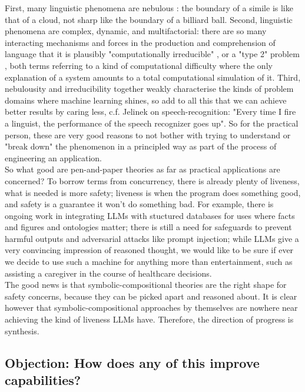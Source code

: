 First, many linguistic phenomena are nebulous \citep{chapmandavidNebulosityMeaningness2010}: the boundary of a simile is like that of a cloud, not sharp like the boundary of a billiard ball. Second, linguistic phenomena are complex, dynamic, and multifactorial: there are so many interacting mechanisms and forces in the production and comprehension of language that it is plausibly "computationally irreducible" \citep{wolframNewKindScience2002}, or a "type 2" problem \citep{marrArtificialIntelligencePersonal1977a}, both terms referring to a kind of computational difficulty where the only explanation of a system amounts to a total computational simulation of it. Third, nebulousity and irreducibility together weakly characterise the kinds of problem domains where machine learning shines, so add to all this that we can achieve better results by caring less, c.f. Jelinek on speech-recognition: "Every time I fire a linguist, the performance of the speech recognizer goes up". So for the practical person, these are very good reasons to not bother with trying to understand or "break down" the phenomenon in a principled way as part of the process of engineering an application.\\

So what good are pen-and-paper theories as far as practical applications are concerned? To borrow terms from concurrency, there is already plenty of liveness, what is needed is more safety; liveness is when the program does something good, and safety is a guarantee it won't do something bad. For example, there is ongoing work in integrating LLMs with stuctured databases for uses where facts and figures and ontologies matter; there is still a need for safeguards to prevent harmful outputs and adversarial attacks like prompt injection; while LLMs give a very convincing impression of reasoned thought, we would like to be sure if ever we decide to use such a machine for anything more than entertainment, such as assisting a caregiver in the course of healthcare decisions.\\

The good news is that symbolic-compositional theories are the right shape for safety concerns, because they can be picked apart and reasoned about. It is clear however that symbolic-compositional approaches by themselves are nowhere near achieving the kind of liveness LLMs have. Therefore, the direction of progress is synthesis.



\subsection{\textbf{Objection:} How does any of this improve capabilities?}

